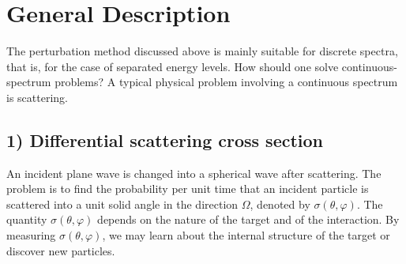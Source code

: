 \section{General Description}
The perturbation method discussed above is mainly suitable for discrete spectra, that is, for the case of separated energy levels. How should one solve continuous-spectrum problems? A typical physical problem involving a continuous spectrum is scattering.

\subsection*{1) Differential scattering cross section}
\begin{center}
\end{center}
An incident plane wave is changed into a spherical wave after scattering. The problem is to find the probability per unit time that an incident particle is scattered into a unit solid angle in the direction $\Omega$, denoted by $\sigma(\theta,\varphi)$. The quantity $\sigma(\theta,\varphi)$ depends on the nature of the target and of the interaction. By measuring $\sigma(\theta,\varphi)$, we may learn about the internal structure of the target or discover new particles.

